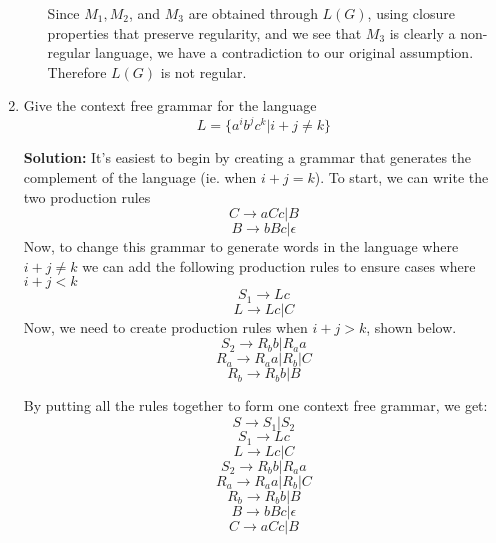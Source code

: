 \documentclass[11pt]{article}
\begin{document}
\begin{enumerate}
\begin{enumerate}
Since $M_1, M_2$, and $M_3$ are obtained through $L(G)$, using closure properties that preserve regularity, and we see that $M_3$ is clearly a non-regular language, we have a contradiction to our original assumption.  Therefore $L(G)$ is not regular.  

\end{enumerate}

\item %
Give the context free grammar for the language
$$ L = \{ a^ib^jc^k | i + j \neq k \} $$

\textbf{Solution: }
It's easiest to begin by creating a grammar that generates the complement of the language (ie. when $i+j = k$).  To start, we can write the two production rules 
$$ C \rightarrow aCc | B $$
$$ B \rightarrow bBc | \epsilon $$
\newpage
Now, to change this grammar to generate words in the language where $i+j \neq k$ we can add the following production rules to ensure cases where $i+j < k$
$$ S_1 \rightarrow Lc $$
$$ L \rightarrow Lc | C $$
Now, we need to create production rules when $i+j > k$, shown below.  
$$ S_2 \rightarrow R_bb | R_aa $$
$$ R_a \rightarrow R_aa | R_b | C $$
$$ R_b \rightarrow R_bb | B $$

By putting all the rules together to form one context free grammar, we get:
$$ S \rightarrow S_1 | S_2 $$
$$ S_1 \rightarrow Lc $$
$$ L \rightarrow Lc | C $$
$$ S_2 \rightarrow R_bb | R_aa $$
$$ R_a \rightarrow R_aa | R_b | C $$
$$ R_b \rightarrow R_bb | B $$
$$ B \rightarrow bBc | \epsilon $$
$$ C \rightarrow aCc | B $$


\end{enumerate}
\end{document}
